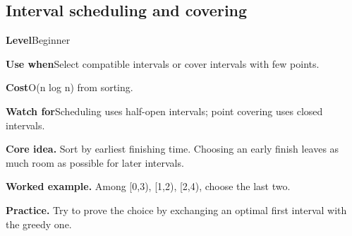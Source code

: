 \documentclass[10pt,letterpaper]{article}
\newcommand{\entrylabel}[1]{\textcolor{accent}{\bfseries #1}}
\begin{document}
\subsection{Interval scheduling and covering}
\begin{guidebox}\small
\entrylabel{Level}\quad Beginner\par
\entrylabel{Use when}\quad Select compatible intervals or cover intervals with few points.\par
\entrylabel{Cost}\quad O(n log n) from sorting.\par
\entrylabel{Watch for}\quad Scheduling uses half-open intervals; point covering uses closed intervals.\par
\end{guidebox}
\noindent\textbf{Core idea.} Sort by earliest finishing time. Choosing an early finish leaves as much room as possible for later intervals.\par
\noindent\textbf{Worked example.} Among [0,3), [1,2), [2,4), choose the last two.\par
\noindent\textbf{Practice.} Try to prove the choice by exchanging an optimal first interval with the greedy one.\par
\end{document}
